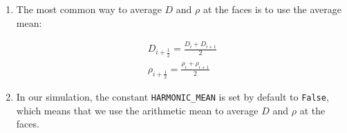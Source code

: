 \documentclass[11pt]{article}
\begin{document}
\begin{enumerate}
  Since the natural definition of $D$ and $\rho$ is at the cell centers (we are used to terms like $\rho_{i+\frac{1}{2}}^{n}$ and $D_{i+\frac{1}{2}}^{n}$), we need to define them at the faces of the cells using some kind of averaging.

  \item The most common way to average $D$ and $\rho$ at the faces is to use the average mean:

  \begin{equation}
    \begin{aligned}
    D_{i+\frac{1}{2}} = \frac{D_{i} + D_{i+1}}{2} \\
    \rho_{i+\frac{1}{2}} = \frac{\rho_{i} + \rho_{i+1}}{2}
    \end{aligned}
  \end{equation}
  \item In our simulation, the constant \texttt{HARMONIC\_MEAN} is set by default to \texttt{False}, which means that we use the arithmetic mean to average $D$ and $\rho$ at the faces.




\end{enumerate}
\end{document}
